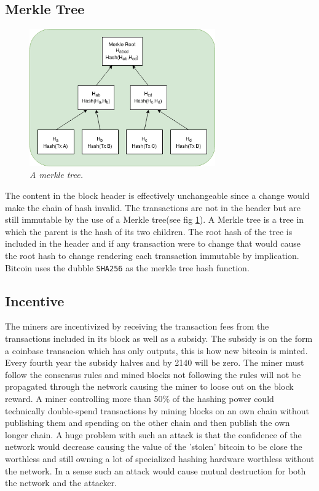 \subsection{Merkle Tree}

\begin{figure}[!htb]
	
	\centering
	\includegraphics[width=8cm]{merkle.png}
	\caption{\textit{A merkle tree. 
	}}
	\label{fig:merkle:tree}
	
\end{figure}

The content in the block header is effectively unchangeable since a change would make the chain of hash invalid. The transactions are not in the header but are still immutable by the use of a Merkle tree(see fig \ref{fig:merkle:tree}). A Merkle tree is a tree in which the parent is the hash of its two children. The root hash of the tree is included in the header and if any transaction were to change that would cause the root hash to change rendering each transaction immutable by implication. Bitcoin uses the dubble \texttt{SHA256} as the merkle tree hash function.

\subsection{Incentive}

The miners are incentivized by receiving the transaction fees from the transactions included in its block as well as a subsidy. The subsidy is on the form a coinbase transacion which has only outputs, this is how new bitcoin is minted. Every fourth year the subsidy halves and by 2140 will be zero. The miner must follow the consensus rules and mined blocks not following the rules will not be propagated through the network causing the miner to loose out on the block reward. A miner controlling more than 50\% of the hashing power could technically double-spend transactions by mining blocks on an own chain without publishing them and spending on the other chain and then publish the own longer chain. A huge problem with such an attack is that the confidence of the network would decrease causing the value of the 'stolen' bitcoin to be close the worthless and still owning a lot of specialized hashing hardware worthless without the network. In a sense such an attack would cause mutual destruction for both the network and the attacker. 

